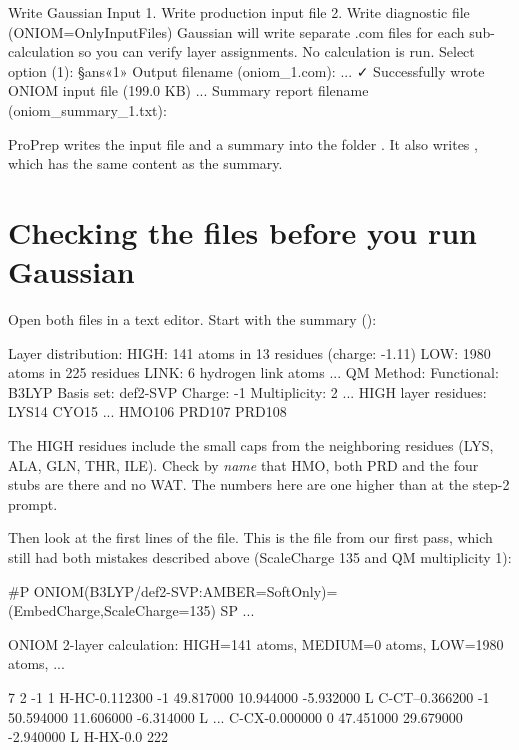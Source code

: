 \begin{screen}
Write Gaussian Input
1. Write production input file
2. Write diagnostic file (ONIOM=OnlyInputFiles)
   Gaussian will write separate .com files for each sub-calculation
   so you can verify layer assignments. No calculation is run.
Select option (1): §ans«1»
Output filename (oniom_1.com):
...
  ✓ Successfully wrote ONIOM input file (199.0 KB)
...
Summary report filename (oniom_summary_1.txt):
\end{screen}

ProPrep writes the input file  and a summary into the
folder . It also writes , which has the same
content as the summary.

\section{Checking the files before you run Gaussian}
\label{sec:qmmm-check}

Open both files in a text editor. Start with the summary
():

\begin{screen}
Layer distribution:
  HIGH:    141 atoms in  13 residues (charge: -1.11)
  LOW:    1980 atoms in 225 residues
  LINK:      6 hydrogen link atoms
...
QM Method:
  Functional: B3LYP
  Basis set:  def2-SVP
  Charge:     -1
  Multiplicity: 2
...
HIGH layer residues:
  LYS14
  CYO15
...
  HMO106
  PRD107
  PRD108
\end{screen}

The HIGH residues include the small caps from the neighboring residues (LYS,
ALA, GLN, THR, ILE). Check by \emph{name} that HMO, both PRD and the four
stubs are there and no WAT. The numbers here are one higher than at the step-2
prompt.

Then look at the first lines of the  file. This is the file from
our first pass, which still had both mistakes described above (ScaleCharge
135 and QM multiplicity 1):

\begin{screen}
#P ONIOM(B3LYP/def2-SVP:AMBER=SoftOnly)=(EmbedCharge,ScaleCharge=135) SP ...

ONIOM 2-layer calculation: HIGH=141 atoms, MEDIUM=0 atoms, LOW=1980 atoms, ...

7 2 -1 1
H-HC-0.112300        -1    49.817000    10.944000    -5.932000 L
C-CT--0.366200       -1    50.594000    11.606000    -6.314000 L
...
C-CX-0.000000         0    47.451000    29.679000    -2.940000 L   H-HX-0.0  222
\end{screen}

